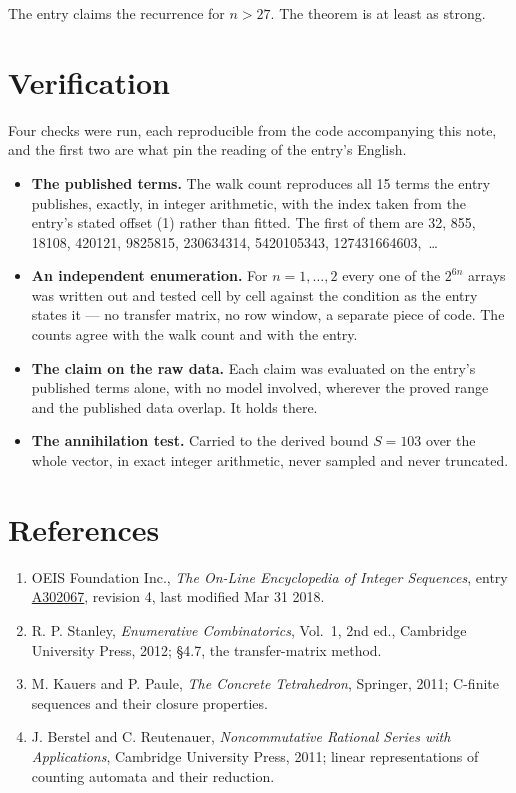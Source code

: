 \documentclass[11pt]{article}
\theoremstyle{definition}
\begin{document}
The entry claims the recurrence for $n > 27$. The theorem is at least as strong.

\section{Verification}

Four checks were run, each reproducible from the code accompanying this note, and the first two are what pin the reading of the entry's English.

\begin{itemize}

\item {\bfseries The published terms.} The walk count reproduces all 15 terms the entry publishes, exactly, in integer arithmetic, with the index taken from the entry's stated offset (1) rather than fitted. The first of them are 32, 855, 18108, 420121, 9825815, 230634314, 5420105343, 127431664603,~\dots

\item {\bfseries An independent enumeration.} For $n = 1,\dots,2$ every one of the $2^{6n}$ arrays was written out and tested cell by cell against the condition as the entry states it --- no transfer matrix, no row window, a separate piece of code. The counts agree with the walk count and with the entry.

\item {\bfseries The claim on the raw data.} Each claim was evaluated on the entry's published terms alone, with no model involved, wherever the proved range and the published data overlap. It holds there.

\item {\bfseries The annihilation test.} Carried to the derived bound $S = 103$ over the whole vector, in exact integer arithmetic, never sampled and never truncated.

\end{itemize}

\section{References}

\begin{enumerate}

\item OEIS Foundation Inc., \emph{The On-Line Encyclopedia of Integer Sequences}, entry \href{https://oeis.org/A302067}{A302067}, revision 4, last modified Mar 31 2018.

\item R. P. Stanley, \emph{Enumerative Combinatorics}, Vol.~1, 2nd ed., Cambridge University Press, 2012; \S4.7, the transfer-matrix method.

\item M. Kauers and P. Paule, \emph{The Concrete Tetrahedron}, Springer, 2011; C-finite sequences and their closure properties.

\item J. Berstel and C. Reutenauer, \emph{Noncommutative Rational Series with Applications}, Cambridge University Press, 2011; linear representations of counting automata and their reduction.

\end{enumerate}
\end{document}
